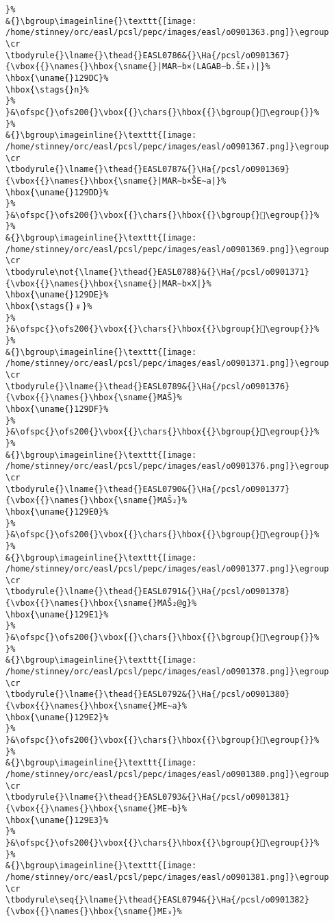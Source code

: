 \begin{verbatim}
}%
&{}\bgroup\imageinline{}\texttt{[image: /home/stinney/orc/easl/pcsl/pepc/images/easl/o0901363.png]}\egroup
\cr
\tbodyrule{}\lname{}\thead{}EASL0786&{}\Ha{/pcsl/o0901367}{\vbox{{}\names{}\hbox{\sname{}|MAR∼b×(LAGAB∼b.ŠE₃)|}%
\hbox{\uname{}129DC}%
\hbox{\stags{}n}%
}%
}&\ofspc{}\ofs200{}\vbox{{}\chars{}\hbox{{}\bgroup{}𒧜\egroup{}}%
}%
&{}\bgroup\imageinline{}\texttt{[image: /home/stinney/orc/easl/pcsl/pepc/images/easl/o0901367.png]}\egroup
\cr
\tbodyrule{}\lname{}\thead{}EASL0787&{}\Ha{/pcsl/o0901369}{\vbox{{}\names{}\hbox{\sname{}|MAR∼b×ŠE∼a|}%
\hbox{\uname{}129DD}%
}%
}&\ofspc{}\ofs200{}\vbox{{}\chars{}\hbox{{}\bgroup{}𒧝\egroup{}}%
}%
&{}\bgroup\imageinline{}\texttt{[image: /home/stinney/orc/easl/pcsl/pepc/images/easl/o0901369.png]}\egroup
\cr
\tbodyrule\not{\lname{}\thead{}EASL0788}&{}\Ha{/pcsl/o0901371}{\vbox{{}\names{}\hbox{\sname{}|MAR∼b×X|}%
\hbox{\uname{}129DE}%
\hbox{\stags{}﹟}%
}%
}&\ofspc{}\ofs200{}\vbox{{}\chars{}\hbox{{}\bgroup{}𒧞\egroup{}}%
}%
&{}\bgroup\imageinline{}\texttt{[image: /home/stinney/orc/easl/pcsl/pepc/images/easl/o0901371.png]}\egroup
\cr
\tbodyrule{}\lname{}\thead{}EASL0789&{}\Ha{/pcsl/o0901376}{\vbox{{}\names{}\hbox{\sname{}MAŠ}%
\hbox{\uname{}129DF}%
}%
}&\ofspc{}\ofs200{}\vbox{{}\chars{}\hbox{{}\bgroup{}𒧟\egroup{}}%
}%
&{}\bgroup\imageinline{}\texttt{[image: /home/stinney/orc/easl/pcsl/pepc/images/easl/o0901376.png]}\egroup
\cr
\tbodyrule{}\lname{}\thead{}EASL0790&{}\Ha{/pcsl/o0901377}{\vbox{{}\names{}\hbox{\sname{}MAŠ₂}%
\hbox{\uname{}129E0}%
}%
}&\ofspc{}\ofs200{}\vbox{{}\chars{}\hbox{{}\bgroup{}𒧠\egroup{}}%
}%
&{}\bgroup\imageinline{}\texttt{[image: /home/stinney/orc/easl/pcsl/pepc/images/easl/o0901377.png]}\egroup
\cr
\tbodyrule{}\lname{}\thead{}EASL0791&{}\Ha{/pcsl/o0901378}{\vbox{{}\names{}\hbox{\sname{}MAŠ₂@g}%
\hbox{\uname{}129E1}%
}%
}&\ofspc{}\ofs200{}\vbox{{}\chars{}\hbox{{}\bgroup{}𒧡\egroup{}}%
}%
&{}\bgroup\imageinline{}\texttt{[image: /home/stinney/orc/easl/pcsl/pepc/images/easl/o0901378.png]}\egroup
\cr
\tbodyrule{}\lname{}\thead{}EASL0792&{}\Ha{/pcsl/o0901380}{\vbox{{}\names{}\hbox{\sname{}ME∼a}%
\hbox{\uname{}129E2}%
}%
}&\ofspc{}\ofs200{}\vbox{{}\chars{}\hbox{{}\bgroup{}𒧢\egroup{}}%
}%
&{}\bgroup\imageinline{}\texttt{[image: /home/stinney/orc/easl/pcsl/pepc/images/easl/o0901380.png]}\egroup
\cr
\tbodyrule{}\lname{}\thead{}EASL0793&{}\Ha{/pcsl/o0901381}{\vbox{{}\names{}\hbox{\sname{}ME∼b}%
\hbox{\uname{}129E3}%
}%
}&\ofspc{}\ofs200{}\vbox{{}\chars{}\hbox{{}\bgroup{}𒧣\egroup{}}%
}%
&{}\bgroup\imageinline{}\texttt{[image: /home/stinney/orc/easl/pcsl/pepc/images/easl/o0901381.png]}\egroup
\cr
\tbodyrule\seq{}\lname{}\thead{}EASL0794&{}\Ha{/pcsl/o0901382}{\vbox{{}\names{}\hbox{\sname{}ME₃}%

\end{verbatim}
